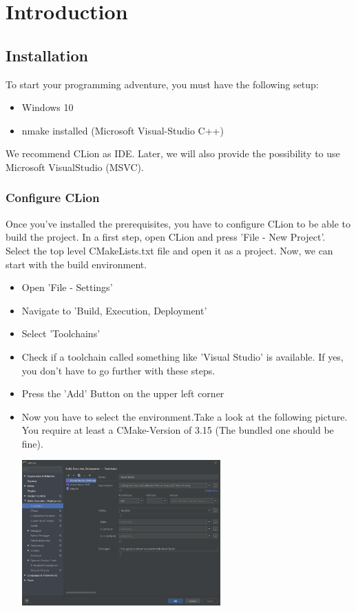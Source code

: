 \newpage
\chapter{Introduction}
\section{Installation}
To start your programming adventure, you must have the following setup:
\begin{itemize}
    \item Windows 10
    \item \gls{nmake} installed (Microsoft Visual-Studio C++)
\end{itemize}
We recommend CLion as IDE. Later, we will also provide the possibility to use Microsoft VisualStudio (MSVC).
\subsection{Configure CLion}
Once you've installed the prerequisites, you have to configure CLion to be able to build the project.
In a first step, open CLion and press 'File - New Project'.
Select the top level CMakeLists.txt file and open it as a project.
Now, we can start with the build environment.
\begin{itemize}
    \item Open 'File - Settings'
    \item Navigate to 'Build, Execution, Deployment'
    \item Select 'Toolchains'
    \item Check if a toolchain called something like 'Visual Studio' is available.
    If yes, you don't have to go further with these steps.
    \item Press the 'Add' Button on the upper left corner
    \item Now you have to select the environment.Take a look at the following picture.
    You require at least a CMake-Version of 3.15 (The bundled one should be fine).\par
    \begin{minipage}{\linewidth}
        \centering
        \includegraphics[width=0.6\textwidth]{../common/chapter_01/resources/01_clion_configure_toolchain.png}
    \end{minipage}
\end{itemize}

